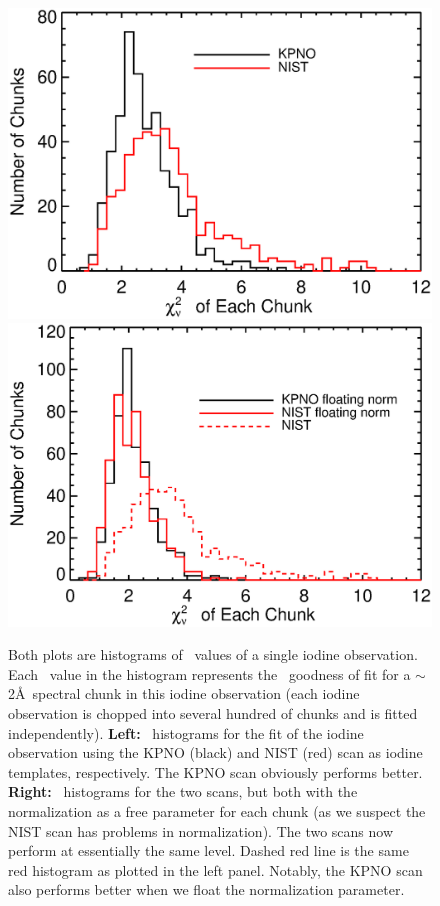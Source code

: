 \begin{figure}[!th]
\includegraphics[angle=0.,scale=0.33]{het/hetfts_oldVSnew_chisq.eps}
\includegraphics[angle=0.,scale=0.33]{het/hetfts_oldVSnew_chisq_dc.eps}
\caption{Both plots are histograms of \chisq\ values of a single
  iodine observation. Each \chisq\ value in the histogram represents
  the \chisq\ goodness of fit for a $\sim$2\AA\ spectral chunk in this
  iodine observation (each iodine observation is chopped into several
  hundred of chunks and is fitted independently).
%
  \textbf{Left:} \chisq\ histograms for the fit of the iodine
  observation using the KPNO (black) and NIST (red) scan as iodine
  templates, respectively. The KPNO scan obviously performs better.
%
  \textbf{Right:} \chisq\ histograms for the two scans, but both with
  the normalization as a free parameter for each chunk (as we suspect
  the NIST scan has problems in normalization). The two scans now
  perform at essentially the same level. Dashed red line is the same
  red histogram as plotted in the left panel. Notably, the KPNO scan
  also performs better when we float the normalization parameter.
  \label{fig:chisq_old_new}}
\end{figure}


